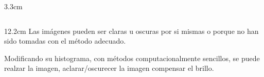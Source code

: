 \begin{frame}
\begin{columns}[t]
\begin{column}{3.3cm}
\end{column}

\end{columns}

\small


\begin{columns}[t]
\begin{column}{12.2cm}
Las im\'{a}genes pueden ser claras u oscuras por si mismas o porque no han sido tomadas con el m\'{e}todo adecuado.

\vspace{0.2cm}

Modificando su histograma, con métodos computacionalmente sencillos, se puede realzar la imagen, aclarar/oscurecer la imagen compensar el brillo.



\end{column}

\end{columns}
\end{frame}


